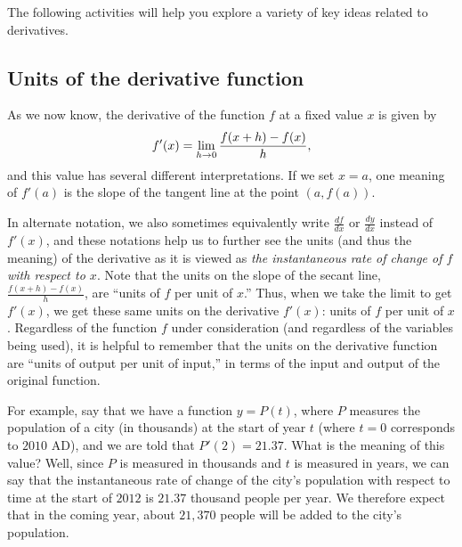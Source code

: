 

The following activities will help you explore a variety of key ideas related to derivatives.



\newpage


\subsection*{Units of the derivative function}

As we now know, the derivative of the function $f$ at a fixed value $x$ is given by
$$f'(x) = \displaystyle \lim_{h \to 0} \frac{f(x+h)-f(x)}{h},$$  and this value has several different interpretations.  If we set $x = a$, one meaning of $f'(a)$ is  the slope of the tangent line at the point $(a,f(a))$.

In alternate notation, we also sometimes equivalently write $\frac{df}{dx}$ or $\frac{dy}{dx}$ instead of $f'(x)$, and these notations help us to further see the units (and thus the meaning) of the derivative as it is viewed as \emph{the instantaneous rate of change of $f$ with respect to $x$}.  Note that the units on the slope of the secant line, $\frac{f(x+h)-f(x)}{h}$, are ``units of $f$ per unit of $x$.''  Thus, when we take the limit to get $f'(x)$, we get these same units on the derivative $f'(x)$:  units of $f$ per unit of $x$.  Regardless of the function $f$ under consideration (and regardless of the variables being used), it is helpful to remember that the units on the derivative function are ``units of output per unit of input,'' in terms of the input and output of the original function.

For example, say that we have a function $y = P(t)$, where $P$ measures the population of a city (in thousands) at the start of year $t$ (where $t = 0$ corresponds to $2010$ AD), and we are told that $P'(2) = 21.37$.  What is the meaning of this value?  Well, since $P$ is measured in thousands and $t$ is measured in years, we can say that the instantaneous rate of change of the city's population with respect to time at the start of $2012$ is $21.37$ thousand people per year.  We therefore expect that in the coming year, about $21,370$ people will be added to the city's population.

